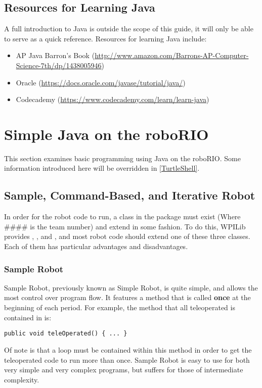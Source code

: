 \documentclass[]{report}
\begin{document}
\subsection{Resources for Learning Java}
A full introduction to Java is outside the scope of this guide, it will only be able to serve as a quick reference.
Resources for learning Java include:
\begin{itemize}
\item AP Java Barron's Book (\url{http://www.amazon.com/Barrons-AP-Computer-Science-7th/dp/1438005946})
\item Oracle (\url{https://docs.oracle.com/javase/tutorial/java/})
\item Codecademy (\url{https://www.codecademy.com/learn/learn-java})
\end{itemize}

\section{Simple Java on the roboRIO}
\label{SimpleJavaontheroboRIO}
This section examines basic programming using Java on the roboRIO.
Some information introduced here will be overridden in \ref{TurtleShell}.

\subsection{Sample, Command-Based, and Iterative Robot}
\label{samplecommanditerative}
In order for the robot code to run, a class in the package  must exist (Where \#\#\#\# is the team number) and extend  in some fashion.
To do this, WPILib provides , , and , and most robot code should extend one of these three classes.
Each of them has particular advantages and disadvantages.

\subsubsection{Sample Robot}
Sample Robot, previously known as Simple Robot, is quite simple, and allows the most control over program flow.
It features a method that is called \textbf{once} at the beginning of each period.
For example, the method that all teleoperated is contained in is:
\begin{lstlisting}
public void teleOperated() { ... }
\end{lstlisting}
Of note is that a loop must be contained within this method in order to get the teleoperated code to run more than once.
Sample Robot is easy to use for both very simple and very complex programs, but suffers for those of intermediate complexity.
\end{document}
